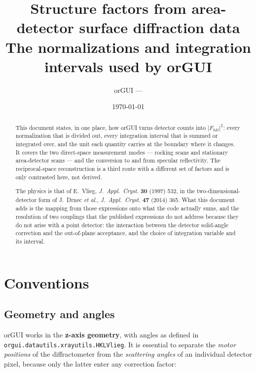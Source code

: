 \documentclass[11pt,a4paper]{article}
\title{Structure factors from area-detector surface diffraction data\\
       \large The normalizations and integration intervals used by orGUI}
\author{orGUI --- \code{orgui\dt datautils\dt xrayutils\dt corrections}}
\date{\today}
\newcommand{\Fhkl}{\left|F_{hkl}\right|^{2}}
\newcommand{\code}[1]{\texttt{\small #1}}
\newcommand{\dt}{.\allowbreak}
\begin{document}
\maketitle

\begin{abstract}
\noindent
This document states, in one place, how orGUI turns detector counts into
$\Fhkl$: every normalization that is divided out, every integration interval
that is summed or integrated over, and the unit each quantity carries at the
boundary where it changes. It covers the two direct-space measurement modes
--- rocking scans and stationary area-detector scans --- and the conversion to
and from specular reflectivity. The reciprocal-space reconstruction is a third
route with a different set of factors and is only contrasted here, not
derived.

The physics is that of E.~Vlieg, \emph{J.~Appl.~Cryst.} \textbf{30} (1997) 532,
in the two-dimensional-detector form of J.~Drnec \emph{et al.},
\emph{J.~Appl.~Cryst.} \textbf{47} (2014) 365. What this document adds is the
mapping from those expressions onto what the code actually sums, and the
resolution of two couplings that the published expressions do not address
because they do not arise with a point detector: the interaction between the
detector solid-angle correction and the out-of-plane acceptance, and the
choice of integration variable and its interval.
\end{abstract}

\tableofcontents

\section{Conventions}

\subsection{Geometry and angles}

orGUI works in the \textbf{z-axis geometry}, with angles as defined in
\code{orgui\dt datautils\dt xrayutils\dt HKLVlieg}. It is essential to
separate the \emph{motor positions} of the diffractometer from the
\emph{scattering angles} of an individual detector pixel, because only the
latter enter any correction factor:
\end{document}
